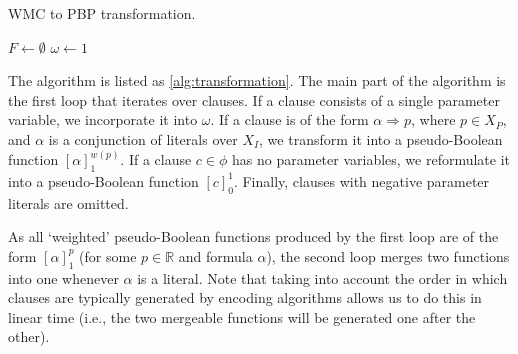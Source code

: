 \begin{algorithm}[t]
  \caption{WMC to PBP transformation.}\label{alg:transformation}
  $F \gets \emptyset$\;
  $\omega \gets 1$\;
\end{algorithm}

The algorithm is listed as \cref{alg:transformation}. The main part of the
algorithm is the first loop that iterates over clauses. If a clause consists of
a single parameter variable, we incorporate it into $\omega$. If a clause is of
the form $\alpha \Rightarrow p$, where $p \in X_P$, and $\alpha$ is a
conjunction of literals over $X_I$, we transform it into a pseudo-Boolean
function ${[\alpha]}_1^{w(p)}$. If a clause $c \in \phi$ has no parameter
variables, we reformulate it into a pseudo-Boolean function ${[c]}_0^1$.
Finally, clauses with negative parameter literals are omitted.

As all `weighted' pseudo-Boolean functions produced by the first loop are of the
form ${[\alpha]}_1^p$ (for some $p \in \mathbb{R}$ and formula $\alpha$), the
second loop merges two functions into one whenever $\alpha$ is a literal. Note
that taking into account the order in which clauses are typically generated by
encoding algorithms allows us to do this in linear time (i.e., the two mergeable
functions will be generated one after the other).


